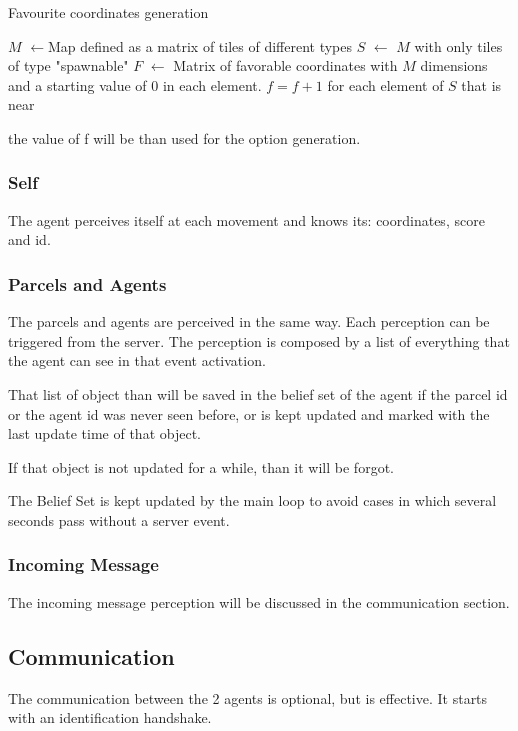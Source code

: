 \documentclass[conference]{IEEEtran}
\begin{document}
\begin{algorithm}[htp]
\begin{algorithmic}[1]

\caption{Favourite coordinates generation }\label{alg:fav_coordinates}
\State $M$ $\gets $Map defined as a matrix of tiles of different types
\State $S$ $\gets$ $M$ with only tiles of type "spawnable"
\State $F$ $\gets$ Matrix of favorable coordinates with $M$ dimensions and a starting value of $0$ in each element. 
    \State $f=f+1$ for each element of $S$ that is near
\EndFor
\end{algorithmic}
\end{algorithm}

the value of f will be than used for the option generation.


\subsubsection{Self}
The agent perceives itself at each movement and knows its:
coordinates, score and id.

\subsubsection{Parcels and Agents}
The parcels and agents are perceived in the same way.
Each perception can be triggered from the server.
The perception is composed by a list of everything that the agent can see in that event activation.

That list of object than will be saved in the belief set of the agent if the parcel id or the agent id was never seen before, or is kept updated and marked with the last update time of that object.

If that object is not updated for a while, than it will be forgot.

The Belief Set is kept updated by the main loop to avoid cases in which several seconds pass without a server event.

\subsubsection{Incoming Message}
The incoming message perception will be discussed in the communication section.
\subsection{Communication}
The communication between the 2 agents is optional, but is effective.
It starts with an identification handshake.
\end{document}
